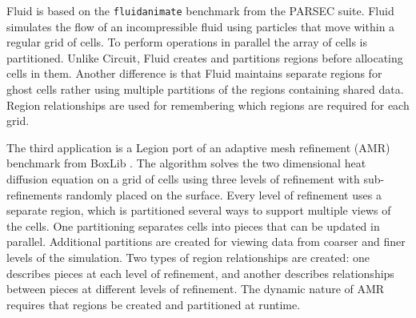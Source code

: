 Fluid is based on the {\tt fluidanimate} benchmark from the PARSEC 
suite\cite{bienia11benchmarking}.  Fluid simulates the flow of an incompressible fluid
using particles that move within a regular grid of cells.  To perform operations in 
parallel the array of cells is partitioned.  Unlike
Circuit, Fluid creates and partitions regions before
allocating cells in them. 
Another difference is that Fluid
maintains separate regions for ghost cells rather using multiple partitions of
the regions containing shared data.  Region relationships are used for remembering
which regions are required for each grid.


The third application is a Legion port of an adaptive mesh refinement (AMR) benchmark 
from BoxLib \cite{BoxLib}.  The algorithm solves the two
dimensional heat diffusion equation on a grid of cells using three levels of refinement with sub-refinements
randomly placed on the surface.  
Every level of refinement uses a separate region, which is partitioned several ways to support multiple views of
the cells.  One partitioning separates cells into pieces that can be updated in
parallel.  Additional partitions are created for viewing data from coarser and finer levels of
the simulation.  Two types of region relationships are created: one describes pieces at 
each level of refinement, and another describes relationships between pieces at different
levels of refinement.  
The dynamic nature of AMR requires that regions be created and partitioned at runtime.  


